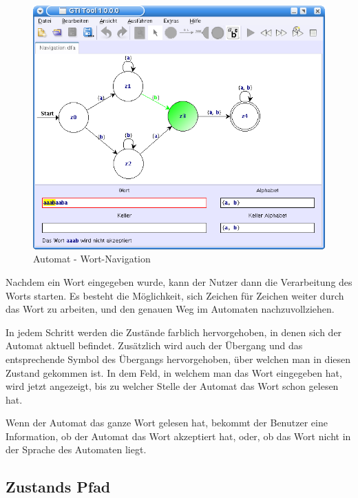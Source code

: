 \begin{figure}[h]
\begin{center}
\includegraphics[width=12cm]{../images/dfa_navigation.png}
\caption{Automat - Wort-Navigation}
\label{FigureWordNavigation}
\end{center}
\end{figure}
\vspace{10pt}

Nachdem ein Wort eingegeben wurde, kann der Nutzer dann die Verarbeitung des
Worts starten. Es besteht die Möglichkeit, sich Zeichen für Zeichen weiter durch
das Wort zu arbeiten, und den genauen Weg im Automaten nachzuvollziehen.\vspace{10pt}

In jedem Schritt werden die Zustände farblich hervorgehoben, in denen sich der
Automat aktuell befindet. Zusätzlich wird auch der Übergang und das
entsprechende Symbol des Übergangs hervorgehoben, über welchen man in diesen
Zustand gekommen ist. In dem Feld, in welchem man das Wort eingegeben hat, wird
jetzt angezeigt, bis zu welcher Stelle der Automat das Wort schon gelesen
hat.\vspace{10pt}

Wenn der Automat das ganze Wort gelesen hat, bekommt der Benutzer eine Information,
ob der Automat das Wort akzeptiert hat, oder, ob das Wort nicht in der Sprache
des Automaten liegt.\vspace{10pt}


\subsection{Zustands Pfad}\label{HistoryPath}


